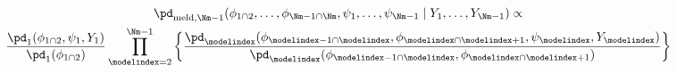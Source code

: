 \begin{multline}
  \pd_{\text{meld}, \Nm - 1}(\phi_{1 \cap 2}, \ldots, \phi_{\Nm - 1 \cap \Nm}, \psi_{1}, \ldots, \psi_{\Nm - 1} \mid Y_{1}, \ldots, Y_{\Nm - 1}) \propto \\
  \frac {
    \pd_{1} (\phi_{1 \cap 2}, \psi_{1}, Y_{1})
  } {
    \pd_{1}(\phi_{1 \cap 2})
  }
  \prod_{\modelindex = 2}^{\Nm - 1} \left\{
    \frac {
      \pd_{\modelindex} (\phi_{\modelindex - 1 \cap \modelindex}, \phi_{\modelindex \cap \modelindex + 1}, \psi_{\modelindex}, Y_{\modelindex})
    } {
      \pd_{\modelindex}(\phi_{\modelindex - 1 \cap \modelindex}, \phi_{\modelindex \cap \modelindex + 1})
    }
  \right\}
  \label{eqn:stage-Mminus1-target}
\end{multline}\\